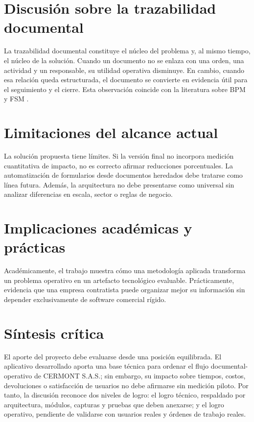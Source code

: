 \section{Discusión sobre la trazabilidad documental}
\label{sec:discusion-trazabilidad}

La trazabilidad documental constituye el núcleo del problema y, al mismo tiempo, el núcleo de la solución. Cuando un documento no se enlaza con una orden, una actividad y un responsable, su utilidad operativa disminuye. En cambio, cuando esa relación queda estructurada, el documento se convierte en evidencia útil para el seguimiento y el cierre. Esta observación coincide con la literatura sobre BPM y FSM \cite{dumas2018,fieldaware2023}.

\section{Limitaciones del alcance actual}
\label{sec:limitaciones-discusion}

La solución propuesta tiene límites. Si la versión final no incorpora medición cuantitativa de impacto, no es correcto afirmar reducciones porcentuales. La automatización de formularios desde documentos heredados debe tratarse como línea futura. Además, la arquitectura no debe presentarse como universal sin analizar diferencias en escala, sector o reglas de negocio.

\section{Implicaciones académicas y prácticas}
\label{sec:implicaciones-discusion}

Académicamente, el trabajo muestra cómo una metodología aplicada transforma un problema operativo en un artefacto tecnológico evaluable. Prácticamente, evidencia que una empresa contratista puede organizar mejor su información sin depender exclusivamente de software comercial rígido.

\section{Síntesis crítica}
\label{sec:sintesis-critica}

El aporte del proyecto debe evaluarse desde una posición equilibrada. El aplicativo desarrollado aporta una base técnica para ordenar el flujo documental-operativo de CERMONT S.A.S.; sin embargo, su impacto sobre tiempos, costos, devoluciones o satisfacción de usuarios no debe afirmarse sin medición piloto. Por tanto, la discusión reconoce dos niveles de logro: el logro técnico, respaldado por arquitectura, módulos, capturas y pruebas que deben anexarse; y el logro operativo, pendiente de validarse con usuarios reales y órdenes de trabajo reales.

